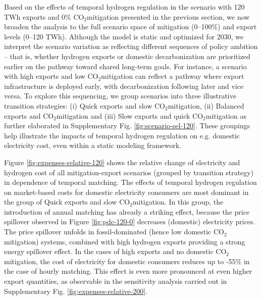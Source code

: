 \documentclass[5p,numafflabel]{elsarticle}
\newcommand{\co}{\ce{CO2}~}
\def\co{CO${}_2${\:}}
\begin{document}

Based on the effects of temporal hydrogen regulation in the scenario with 120 TWh exports and 0\% \co mitigation presented in the previous section, we now broaden the analysis to the full scenario space of mitigation (0–100\%) and export levels (0–120 TWh).
Although the model is static and optimized for 2030, we interpret the scenario variation as reflecting different sequences of policy ambition -- that is, whether hydrogen exports or domestic decarbonization are prioritized earlier on the pathway toward shared long-term goals. For instance, a scenario with high exports and low \co mitigation can reflect a pathway where export infrastructure is deployed early, with decarbonization following later and vice versa.
To explore this sequencing, we group scenarios into three illustrative transition strategies: 
(i) Quick exports and slow \co mitigation,
(ii) Balanced exports and \co mitigation and
(iii) Slow exports and quick \co mitigation as further elaborated in Supplementary Fig. \ref{fig:scenario-sel-120}.
These groupings help illustrate the impacts of temporal hydrogen regulation on e.g. domestic electricity cost, even within a static modeling framework.

Figure \ref{fig:expenses-relative-120} shows the relative change of electricity and hydrogen cost of all mitigation-export scenarios (grouped by transition strategy) in dependence of temporal matching. 
The effects of temporal hydrogen regulation on market-based costs for domestic electricity consumers are most dominant in the group of Quick exports and slow \co mitigation.
In this group, the introduction of annual matching has already a striking effect, because the price spillover observed in Figure \ref{fig:pdc-120-0} decreases (domestic) electricity prices. The price spillover unfolds in fossil-dominated (hence low domestic \co mitigation) systems, combined with high hydrogen exports providing a strong energy spillover effect. In the cases of high exports and no domestic \co mitigation, the cost of electricity for domestic consumers reduces up to -55\% in the case of hourly matching.
This effect is even more pronounced at even higher export quantities, as observable in the sensitivity analysis carried out in Supplementary Fig. \ref{fig:expenses-relative-200}.
\end{document}
